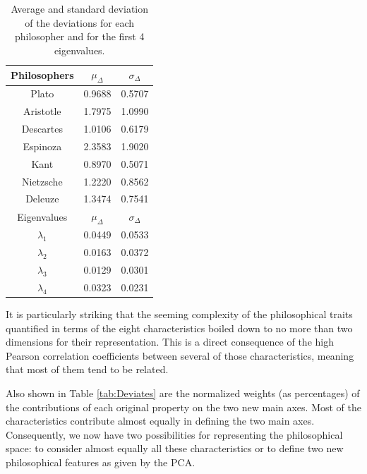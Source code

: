 \documentclass[%
 aip,
 jmp,%
 amsmath,amssymb,
 reprint,%
]{revtex4-1}
\begin{document}
\begin{table}%
\caption{\label{tab:tableD}Average and standard deviation of the 
deviations for each philosopher and for the first 
4 eigenvalues.  }

\begin{tabular}{|c||c|c|}
\hline

Philosophers & $\mu_{\Delta}$ & $\sigma_{\Delta}$ \\
\hline
Plato     & 0.9688 & 0.5707 \\
Aristotle & 1.7975 & 1.0990 \\
Descartes & 1.0106 & 0.6179 \\
Espinoza & 2.3583 & 1.9020 \\
Kant & 0.8970 & 0.5071 \\
Nietzsche & 1.2220 & 0.8562 \\
Deleuze & 1.3474 & 0.7541 \\
\hline \hline
Eigenvalues & $\mu_{\Delta}$ & $\sigma_{\Delta}$ \\
\hline
$\lambda_1$ &  0.0449 & 0.0533 \\
$\lambda_2$ &  0.0163 & 0.0372 \\
$\lambda_3$ &  0.0129 & 0.0301 \\
$\lambda_4$ &  0.0323 & 0.0231 \\
\hline

\end{tabular}
\end{table}

It is particularly striking that the seeming complexity of the
philosophical traits quantified in terms of the eight characteristics
boiled down to no more than two dimensions for their representation.
This is a direct consequence of the high Pearson correlation
coefficients between several of those characteristics, meaning that
most of them tend to be related.

Also shown in Table \ref{tab:Deviates} are the normalized weights (as
percentages) of the contributions of each original property on the two
new main axes.  Most of the characteristics contribute almost equally
in defining the two main axes.  Consequently, we now have two
possibilities for representing the philosophical space: to consider
almost equally all these characteristics or to define two new
philosophical features as given by the PCA.
\end{document}
